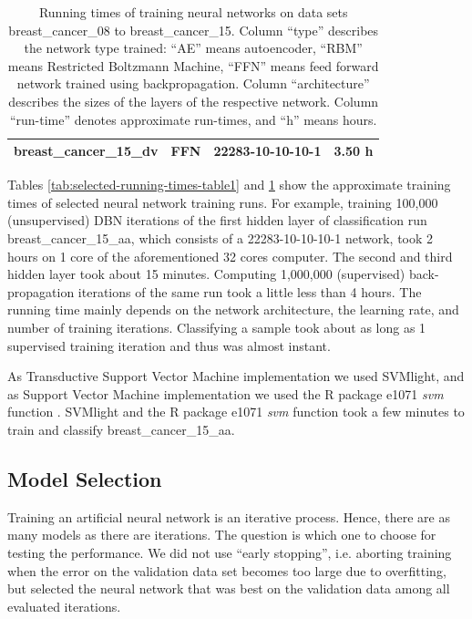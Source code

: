 \begin{table}
\begin{centering}
\begin{tabular}{|c|c|c|c|}
\hline 
breast\_cancer\_15\_dv & FFN & 22283-10-10-10-1 & 3.50 h\tabularnewline
\hline 
\end{tabular}
\par\end{centering}
\caption[Running times of training selected neural networks, table 2.]{\label{tab:selected-running-times-table2}Running times of training
neural networks on data sets breast\_cancer\_08 to breast\_cancer\_15.
Column ``type'' describes the network type trained: ``AE'' means
autoencoder, ``RBM'' means Restricted Boltzmann Machine, ``FFN''
means feed forward network trained using backpropagation. Column ``architecture''
describes the sizes of the layers of the respective network. Column
``run-time'' denotes approximate run-times, and ``h'' means hours.}
\end{table}

Tables \ref{tab:selected-running-times-table1} and \ref{tab:selected-running-times-table2}
show the approximate training times of selected neural network training
runs. For example, training 100,000 (unsupervised) DBN iterations
of the first hidden layer of classification run breast\_cancer\_15\_aa,
which consists of a 22283-10-10-10-1 network, took 2 hours on 1 core
of the aforementioned 32 cores computer. The second and third hidden
layer took about 15 minutes. Computing 1,000,000 (supervised) back-propagation
iterations of the same run took a little less than 4 hours. The running
time mainly depends on the network architecture, the learning rate,
and number of training iterations. Classifying a sample took about
as long as 1 supervised training iteration and thus was almost instant.

As Transductive Support Vector Machine implementation we used SVMlight,
and as Support Vector Machine implementation we used the R package
e1071 \emph{svm} function \cite{Joachims1999,R2008}. SVMlight and
the R package e1071 \emph{svm} function took a few minutes to train
and classify breast\_cancer\_15\_aa.

\subsection{Model Selection\label{subsec:Model-selection}}

Training an artificial neural network is an iterative process. Hence,
there are as many models as there are iterations. The question is
which one to choose for testing the performance. We did not use ``early
stopping'', i.e. aborting training when the error on the validation
data set becomes too large due to overfitting,
but selected the neural network that was best on the validation data
among all evaluated iterations.

